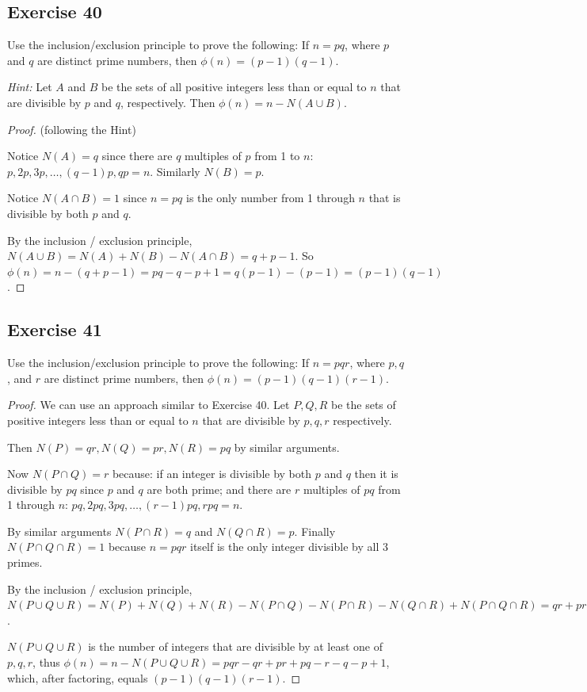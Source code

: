 \documentclass[14pt]{extarticle}
\begin{document}
\subsection{Exercise 40}
Use the inclusion/exclusion principle to prove the following: If \(n = pq\), where $p$ and $q$ are distinct prime numbers, then \(\phi(n) = (p - 1)(q - 1)\).

     {\it Hint:} Let $A$ and $B$ be the sets of all positive integers less than or equal to $n$ that are divisible by
$p$ and $q$, respectively. Then \(\phi(n) = n - N(A \cup B)\).

\begin{proof}
     (following the Hint)

     Notice \(N(A) = q\) since there are $q$ multiples of $p$ from 1 to $n$: \(p, 2p, 3p, \ldots, (q-1)p, qp = n\).
     Similarly \(N(B) = p\).

     Notice \(N(A \cap B) = 1\) since \(n = pq\) is the only number from 1 through $n$ that is divisible by both $p$ and $q$.

     By the inclusion / exclusion principle, \(N(A \cup B) = N(A) + N(B) - N(A \cap B) = q + p - 1\). So \(\phi(n) = n -
     (q+p-1) = pq-q-p+1 = q(p-1) - (p-1) = (p-1)(q-1)\).
\end{proof}

\subsection{Exercise 41}
Use the inclusion/exclusion principle to prove the following: If \(n = pqr\), where \(p, q\), and \(r\) are
distinct prime numbers, then \(\phi(n) = (p - 1)(q - 1)(r - 1)\).

\begin{proof}
     We can use an approach similar to Exercise 40. Let \(P, Q, R\) be the sets of positive integers less than or equal to
     $n$ that are divisible by \(p,q,r\) respectively.

     Then \(N(P) = qr, N(Q) = pr, N(R) = pq\) by similar arguments.

     Now \(N(P \cap Q) = r\) because: if an integer is divisible by both $p$ and $q$ then it is divisible by $pq$ since $p$
     and $q$ are both prime; and there are $r$ multiples of $pq$ from 1 through $n$: \(pq, 2pq, 3pq, \ldots, (r-1)pq, rpq = n\).

     By similar arguments \(N(P \cap R) = q\) and \(N(Q \cap R) = p\). Finally \(N(P \cap Q \cap R) = 1\) because \(n=pqr\)
     itself is the only integer divisible by all 3 primes.

     By the inclusion / exclusion principle, \(N(P \cup Q \cup R) = N(P) + N(Q) + N(R) - N(P \cap Q) -N(P \cap R) - N(Q
     \cap R) + N(P \cap Q \cap R) = qr + pr + pq - r - q - p + 1\).

     \(N(P \cup Q \cup R)\) is the number of integers that are divisible by at least one of \(p,q,r\), thus \(\phi(n) =
     n - N(P \cup Q \cup R) = pqr - qr + pr + pq - r - q - p + 1\), which, after factoring, equals \((p-1)(q-1)(r-1)\).
\end{proof}
\end{document}
